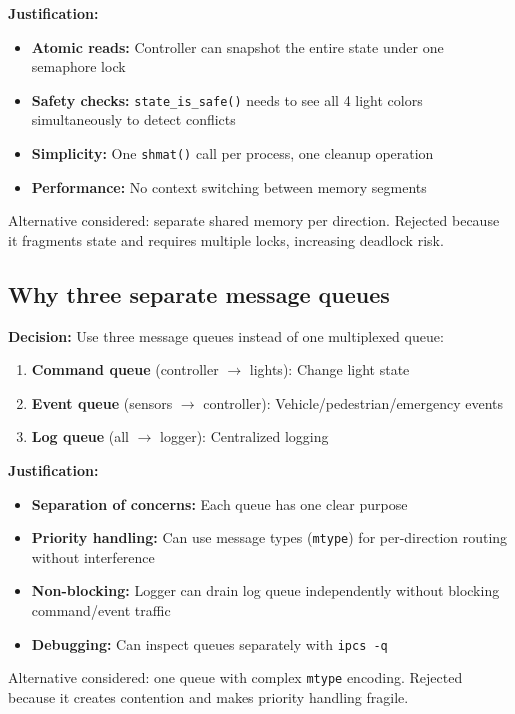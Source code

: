 \documentclass[11pt,a4paper]{article}
\begin{document}
\textbf{Justification:} 
\begin{itemize}[noitemsep]
    \item \textbf{Atomic reads:} Controller can snapshot the entire state under one semaphore lock
    \item \textbf{Safety checks:} \texttt{state\_is\_safe()} needs to see all 4 light colors simultaneously to detect conflicts
    \item \textbf{Simplicity:} One \texttt{shmat()} call per process, one cleanup operation
    \item \textbf{Performance:} No context switching between memory segments
\end{itemize}

Alternative considered: separate shared memory per direction. Rejected because it fragments state and requires multiple locks, increasing deadlock risk.

\subsection{Why three separate message queues}

\textbf{Decision:} Use three message queues instead of one multiplexed queue:
\begin{enumerate}[noitemsep]
    \item \textbf{Command queue} (controller $\rightarrow$ lights): Change light state
    \item \textbf{Event queue} (sensors $\rightarrow$ controller): Vehicle/pedestrian/emergency events
    \item \textbf{Log queue} (all $\rightarrow$ logger): Centralized logging
\end{enumerate}

\textbf{Justification:}
\begin{itemize}[noitemsep]
    \item \textbf{Separation of concerns:} Each queue has one clear purpose
    \item \textbf{Priority handling:} Can use message types (\texttt{mtype}) for per-direction routing without interference
    \item \textbf{Non-blocking:} Logger can drain log queue independently without blocking command/event traffic
    \item \textbf{Debugging:} Can inspect queues separately with \texttt{ipcs -q}
\end{itemize}

Alternative considered: one queue with complex \texttt{mtype} encoding. Rejected because it creates contention and makes priority handling fragile.
\end{document}
